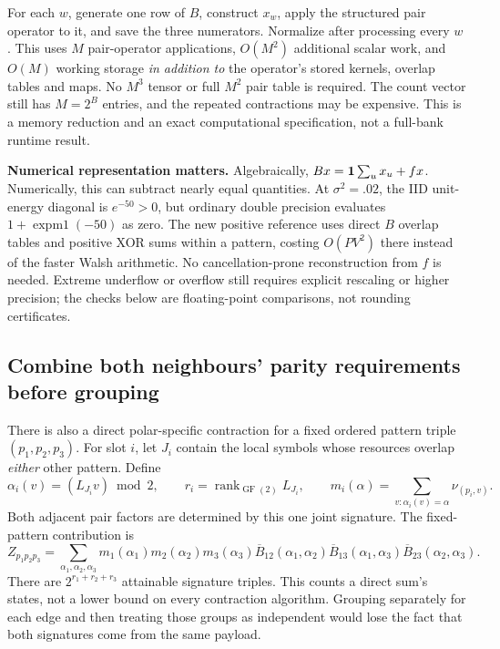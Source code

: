 \documentclass[10pt,a4paper]{article}
\newcommand{\GF}{\operatorname{GF}}
\begin{document}
For each $w$, generate one row of $B$, construct $x_w$, apply the structured pair operator to it, and save
the three numerators. Normalize after processing every $w$. This uses $M$ pair-operator applications,
$O(M^2)$ additional scalar work, and $O(M)$ working storage \emph{in addition to} the operator's stored
kernels, overlap tables and maps. No $M^3$ tensor or full $M^2$ pair table is required. The count vector still
has $M=2^B$ entries, and the repeated contractions may be expensive. This is a memory reduction and an exact
computational specification, not a full-bank runtime result.

\textbf{Numerical representation matters.} Algebraically, $Bx=\mathbf{1}\sum_u x_u+fx$. Numerically, this can subtract
nearly equal quantities. At $\sigma^2=.02$, the IID unit-energy diagonal is $e^{-50}>0$, but ordinary double
precision evaluates $1+\operatorname{expm1}(-50)$ as zero. The new positive reference uses direct $B$ overlap
tables and positive XOR sums within a pattern, costing $O(PV^2)$ there instead of the faster Walsh arithmetic.
No cancellation-prone reconstruction from $f$ is needed. Extreme underflow or overflow still requires explicit
rescaling or higher precision; the checks below are floating-point comparisons, not rounding certificates.

\clearpage
\subsection{Combine both neighbours' parity requirements before grouping}
There is also a direct polar-specific contraction for a fixed ordered pattern triple $(p_1,p_2,p_3)$.
For slot $i$, let $J_i$ contain the local symbols whose resources overlap \emph{either} other pattern. Define
\[
 \alpha_i(v)=(L_{J_i}v)\bmod2,\qquad
 r_i=\operatorname{rank}_{\GF(2)}L_{J_i},\qquad
 m_i(\alpha)=\sum_{v:\alpha_i(v)=\alpha}\nu_{(p_i,v)}.
\]
Both adjacent pair factors are determined by this one joint signature. The fixed-pattern contribution is
\begin{equation}
 Z_{p_1p_2p_3}=
 \sum_{\alpha_1,\alpha_2,\alpha_3}
 m_1(\alpha_1)m_2(\alpha_2)m_3(\alpha_3)
 \overline B_{12}(\alpha_1,\alpha_2)
 \overline B_{13}(\alpha_1,\alpha_3)
 \overline B_{23}(\alpha_2,\alpha_3).
 \label{eq:triangle-quotient}
\end{equation}
There are $2^{r_1+r_2+r_3}$ attainable signature triples. This counts a direct sum's states, not a lower bound
on every contraction algorithm. Grouping separately for each edge and then treating those groups as independent
would lose the fact that both signatures come from the same payload.
\end{document}
